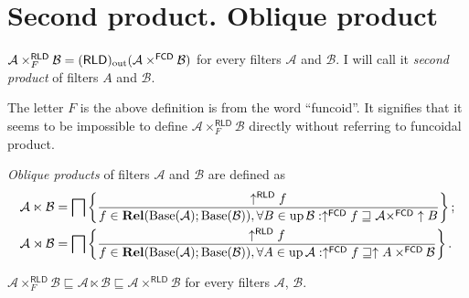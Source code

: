 \section{Second product. Oblique product}
\begin{defn}
$\mathcal{A}\times_{F}^{\mathsf{RLD}}\mathcal{B}=(\mathsf{RLD})_{\mathrm{out}}(\mathcal{A}\times^{\mathsf{FCD}}\mathcal{B})$
for every filters $\mathcal{A}$ and $\mathcal{B}$. I will call it
\emph{second product} of filters $A$ and $\mathcal{B}$.\end{defn}
\begin{rem}
The letter $F$ is the above definition is from the word ``funcoid''.
It signifies that it seems to be impossible to define $\mathcal{A}\times_{F}^{\mathsf{RLD}}\mathcal{B}$
directly without referring to funcoidal product.\end{rem}
\begin{defn}
\emph{Oblique products} of filters $\mathcal{A}$
and $\mathcal{B}$ are defined as
\begin{align*}
\mathcal{A}\ltimes\mathcal{B} & =\bigsqcap\left\{ \frac{\uparrow^{\mathsf{RLD}}f}{f\in\mathbf{Rel}(\operatorname{Base}(\mathcal{A});\operatorname{Base}(\mathcal{B})),\forall B\in\operatorname{up}\mathcal{B}:\uparrow^{\mathsf{FCD}}f\sqsupseteq\mathcal{A}\times^{\mathsf{FCD}}\uparrow B}\right\};\\
\mathcal{A}\rtimes\mathcal{B} & =\bigsqcap\left\{ \frac{\uparrow^{\mathsf{RLD}}f}{f\in\mathbf{Rel}(\operatorname{Base}(\mathcal{A});\operatorname{Base}(\mathcal{B})),\forall A\in\operatorname{up}\mathcal{A}:\uparrow^{\mathsf{FCD}}f\sqsupseteq\uparrow A\times^{\mathsf{FCD}}\mathcal{B}}\right\}.
\end{align*}
\end{defn}
\begin{prop}
$\mathcal{A}\times_{F}^{\mathsf{RLD}}\mathcal{B}\sqsubseteq\mathcal{A}\ltimes\mathcal{B}\sqsubseteq\mathcal{A}\times^{\mathsf{RLD}}\mathcal{B}$
for every filters $\mathcal{A}$, $\mathcal{B}$.\end{prop}
